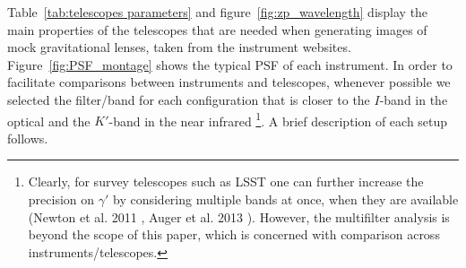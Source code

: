 \documentclass[a4paper,11pt]{article}
\begin{document}
Table~\ref{tab:telescopes parameters} and
figure~\ref{fig:zp_wavelength} display the main properties of the
telescopes that are needed when generating images of mock
gravitational lenses, taken from the instrument
websites. Figure~\ref{fig:PSF_montage} shows the typical PSF of each
instrument. In order to facilitate comparisons between instruments and
telescopes, whenever possible we selected the filter/band for each
configuration that is closer to the $I$-band in the optical and the
$K'$-band in the near infrared \footnote{Clearly, for survey
telescopes such as LSST one can further increase the precision on
$\gamma'$ by considering multiple bands at once, when they are
available (Newton et al. 2011 \citep{2011ApJ...734..104N},
Auger et al. 2013 \citep{2013MNRAS.436..503A}). However, the
multifilter analysis is beyond the scope of this paper, which is
concerned with comparison across instruments/telescopes.}. A brief
description of each setup follows.
\end{document}
